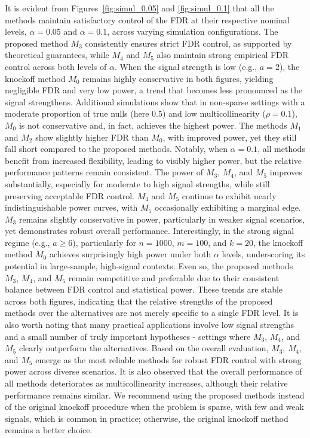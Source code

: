 \documentclass[11pt]{article}
\numberwithin{equation}{section}
\theoremstyle{plain}
\theoremstyle{remark}
\begin{document}
It is evident from Figures~\ref{fig:simul_0.05} and \ref{fig:simul_0.1} that all the methods maintain satisfactory control of the FDR at their respective nominal levels, $\alpha = 0.05$ and $\alpha = 0.1$, across varying simulation configurations. The proposed method $M_3$ consistently ensures strict FDR control, as supported by theoretical guarantees, while $M_4$ and $M_5$ also maintain strong empirical FDR control across both levels of $\alpha$. When the signal strength is low (e.g., $a = 2$), the knockoff method $M_0$ remains highly conservative in both figures, yielding negligible FDR and very low power, a trend that becomes less pronounced as the signal strengthens. Additional simulations show that in non-sparse settings with a moderate proportion of true nulls (here \(0.5\)) and low multicollinearity (\(\rho = 0.1\)), \(M_0\) is not conservative and, in fact, achieves the highest power. The methods $M_1$ and $M_2$ show slightly higher FDR than $M_0$, with improved power, yet they still fall short compared to the proposed methods. Notably, when $\alpha = 0.1$, all methods benefit from increased flexibility, leading to visibly higher power, but the relative performance patterns remain consistent. The power of $M_3$, $M_4$, and $M_5$ improves substantially, especially for moderate to high signal strengths, while still preserving acceptable FDR control. $M_4$ and $M_5$ continue to exhibit nearly indistinguishable power curves, with $M_5$ occasionally exhibiting a marginal edge. $M_3$ remains slightly conservative in power, particularly in weaker signal scenarios, yet demonstrates robust overall performance. Interestingly, in the strong signal regime (e.g., $a \geq 6$), particularly for $n = 1000$, $m = 100$, and $k = 20$, the knockoff method $M_0$ achieves surprisingly high power under both $\alpha$ levels, underscoring its potential in large-sample, high-signal contexts. Even so, the proposed methods $M_3$, $M_4$, and $M_5$ remain competitive and preferable due to their consistent balance between FDR control and statistical power. These trends are stable across both figures, indicating that the relative strengths of the proposed methods over the alternatives are not merely specific to a single FDR level. It is also worth noting that many practical applications involve low signal strengths and a small number of truly important hypotheses - settings where $M_3$, $M_4$, and $M_5$ clearly outperform the alternatives. Based on the overall evaluation, $M_3$, $M_4$, and $M_5$ emerge as the most reliable methods for robust FDR control with strong power across diverse scenarios. It is also observed that the overall performance of all methods deteriorates as multicollinearity increases, although their relative performance remains similar. We recommend using the proposed methods instead of the original knockoff procedure when the problem is sparse, with few and weak signals, which is common in practice; otherwise, the original knockoff method remains a better choice.
\end{document}
